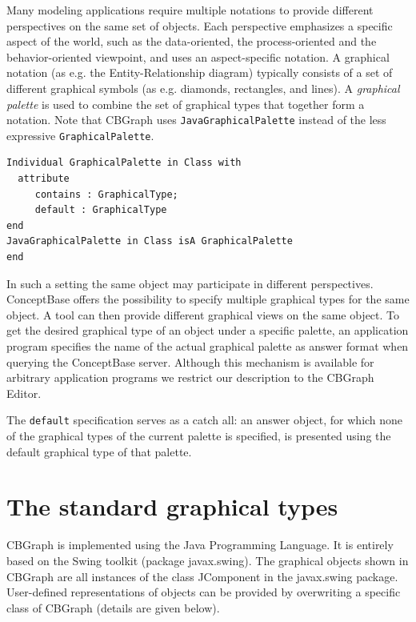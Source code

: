 Many modeling applications require multiple notations to provide different
perspectives on the same set of objects. Each perspective
emphasizes a specific aspect of the world, such as the data-oriented,
the process-oriented and the behavior-oriented viewpoint, and
uses an aspect-specific notation.
A graphical notation (as e.g. the Entity-Relationship diagram)
typically consists of a set of different graphical symbols
(as e.g. diamonds, rectangles, and lines).
A {\em graphical palette} is used to combine the set of
graphical types that together form a notation.
Note that CBGraph uses {\tt JavaGraphicalPalette} instead of the less
expressive {\tt GraphicalPalette}. 

{\small
\begin{verbatim}
Individual GraphicalPalette in Class with
  attribute
     contains : GraphicalType;
     default : GraphicalType
end
JavaGraphicalPalette in Class isA GraphicalPalette 
end 
\end{verbatim}
}


In such a setting the same object may participate in different perspectives.
ConceptBase offers the possibility to specify multiple graphical types for
the same object. A tool can then provide different graphical views on the
same object. To get the desired graphical type of an object under a specific
palette, an application program specifies the name of the actual graphical
palette as answer format when querying the ConceptBase server. Although this
mechanism is available for arbitrary application programs we restrict our
description to the CBGraph Editor.

The {\tt default} specification serves as a catch all: an answer object, for
which none of the graphical types of the current palette is specified, is
presented using the default graphical type of that palette.



\section{The standard graphical types}
\label{GTsforGB}

CBGraph is implemented using the Java Programming Language.
It is entirely based on the Swing toolkit (package javax.swing).
The graphical objects shown in CBGraph are all instances
of the class JComponent in the javax.swing package. User-defined
representations of objects can be provided by overwriting a specific
class of CBGraph (details are given below).

